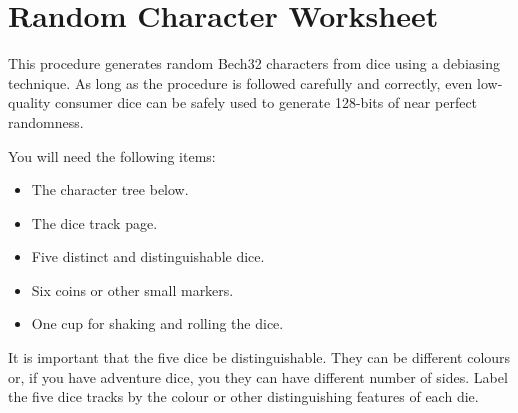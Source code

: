 \documentclass{article}
\begin{document}
\section{Random Character Worksheet}

This procedure generates random Bech32 characters from dice using a debiasing
technique. As long as the procedure is followed carefully and correctly, even
low-quality consumer dice can be safely used to generate 128-bits of near
perfect randomness.

You will need the following items:
\begin{itemize}
  \item The character tree below.
  
  \item The dice track page.
  
  \item Five distinct and distinguishable dice.
  
  \item Six coins or other small markers.
  
  \item One cup for shaking and rolling the dice.
\end{itemize}
It is important that the five dice be distinguishable. They can be different
colours or, if you have adventure dice, you they can have different number of
sides. Label the five dice tracks by the colour or other distinguishing
features of each die.
\end{document}
